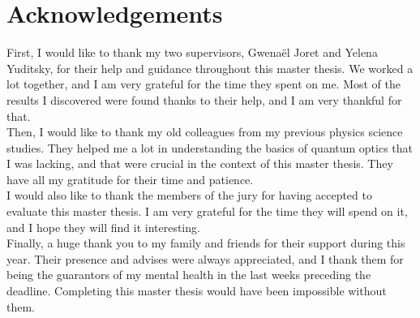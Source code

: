 \setcounter{secnumdepth}{-1}

\chapter{Acknowledgements}
\label{ch:acknowledgements}

First, I would like to thank my two supervisors, Gwenaël Joret and Yelena Yuditsky, for their help and guidance throughout this master thesis.
We worked a lot together, and I am very grateful for the time they spent on me.
Most of the results I discovered were found thanks to their help, and I am very thankful for that.\\

Then, I would like to thank my old colleagues from my previous physics science studies.
They helped me a lot in understanding the basics of quantum optics that I was lacking, and that were crucial in the context of this master thesis.
They have all my gratitude for their time and patience.\\

I would also like to thank the members of the jury for having accepted to evaluate this master thesis.
I am very grateful for the time they will spend on it, and I hope they will find it interesting.\\

Finally, a huge thank you to my family and friends for their support during this year.
Their presence and advises were always appreciated, and I thank them for being the guarantors of my mental health in the last weeks preceding the deadline.
Completing this master thesis would have been impossible without them.\\
